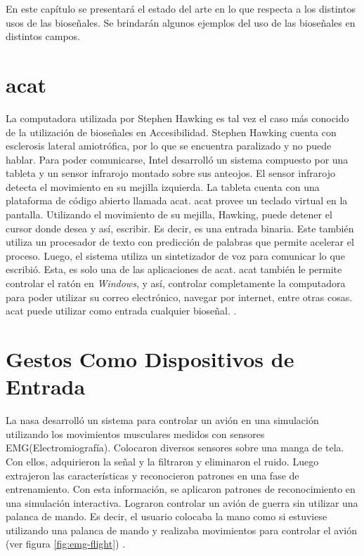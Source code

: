 En este capítulo se presentará el estado del arte en lo que respecta a los distintos usos de las bioseñales. Se brindarán algunos ejemplos del uso de las bioseñales en distintos campos.

\section{\acrshort{acat}}

La computadora utilizada por Stephen Hawking es tal vez el caso más conocido de la utilización de bioseñales en Accesibilidad. Stephen Hawking cuenta con esclerosis lateral amiotrófica, por lo que se encuentra paralizado y no puede hablar. Para poder comunicarse, Intel desarrolló un sistema compuesto por una tableta y un sensor infrarojo montado sobre sus anteojos. El sensor infrarojo detecta el movimiento en su mejilla izquierda. La tableta cuenta con una plataforma de código abierto llamada \acrshort{acat}. \acrshort{acat} provee un teclado virtual en la pantalla. Utilizando el movimiento de su mejilla, Hawking, puede detener el cursor donde desea y así, escribir. Es decir, es una entrada binaria. Este también utiliza un procesador de texto con predicción de palabras que permite acelerar el proceso.  Luego, el sistema utiliza un sintetizador de voz para comunicar lo que escribió. Esta, es solo una de las aplicaciones de \acrshort{acat}. \acrshort{acat} también le permite controlar el ratón en \emph{Windows}, y así, controlar completamente la computadora para poder utilizar su correo electrónico, navegar por internet, entre otras cosas. \acrshort{acat} puede utilizar como entrada cualquier bioseñal. \cite{hawking}.

\section{Gestos Como Dispositivos de Entrada}

La \acrshort{nasa} desarrolló un sistema para controlar un avión en una simulación utilizando los movimientos musculares medidos con sensores EMG(Electromiografía). Colocaron diversos sensores sobre una manga de tela. Con ellos, adquirieron la señal y la filtraron y eliminaron el ruido. Luego extrajeron las características y reconocieron patrones en una fase de entrenamiento. Con esta información, se aplicaron patrones de reconocimiento en una simulación interactiva. Lograron controlar un avión de guerra sin utilizar una palanca de mando. Es decir, el usuario colocaba la mano como si estuviese utilizando una palanca de mando y realizaba movimientos para controlar el avión (ver figura \ref{fig:emg-flight}) \cite{emg-flight}.

